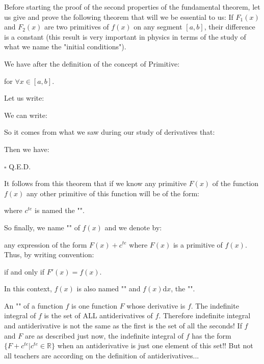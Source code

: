 	Before starting the proof of the second properties of the fundamental theorem, let us give and prove the following theorem that will we be essential to us: If $F_1(x)$ and $F_2(x)$ are two primitives of $f(x)$ on any segment $[a, b]$, their difference is a constant (this result is very important in physics in terms of the study of what we name the "initial conditions").
	\begin{dem}
	We have after the definition of the concept of Primitive:
	
	for $\forall x \in [a,b]$.
	
	Let us write:
	
	We can write:
	
	So it comes from what we saw during our study of derivatives that:
	
	Then we have:
	
	\begin{flushright}
		$\square$  Q.E.D.
	\end{flushright}
	\end{dem}
	It follows from this theorem that if we know any primitive $F (x)$ of the function $f (x)$ any other primitive of this function will be of the form:
	
	where $c^{te}$ is named the "\label{constant of integration}".
	
	So finally, we name "" of $f (x)$ and we denote by:
	
	any expression of the form $F (x)+c^{te}$ where $F(x)$ is a primitive of $f(x)$. Thus, by writing convention:
	
	if and only if $F'(x)=f(x)$.
	
	In this context, $f (x)$ is also named "" and $f (x) \mathrm{d}x$, the "".
	\begin{tcolorbox}[title=Remark,colframe=black,arc=10pt]
	An "" of a function $f$ is one function $F$ whose derivative is $f$. The indefinite integral of $f$ is the set of ALL antiderivatives of $f$. Therefore indefinite integral and antiderivative is not the same as the first is the set of all the seconds! If $f$ and $F$ are as described just now, the indefinite integral of $f$ has the form $\{F+c^{te}|c^{te}\in\mathbb{R}\}$ when an antiderivative is just one element of this set!! But not all teachers are according on the definition of antiderivatives...
	\end{tcolorbox}
	
